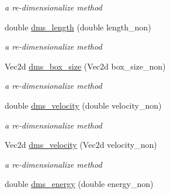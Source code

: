 \begin{CompactItemize}
\begin{CompactList}\small\item\em a re-dimensionalize method \item\end{CompactList}\item 
\hypertarget{classInitiation_d6747d9cbd12e6327249606b021a87f1}{
double \hyperlink{classInitiation_d6747d9cbd12e6327249606b021a87f1}{dms\_\-length} (double length\_\-non)}
\label{classInitiation_d6747d9cbd12e6327249606b021a87f1}

\begin{CompactList}\small\item\em a re-dimensionalize method \item\end{CompactList}\item 
\hypertarget{classInitiation_8b5815911256da330c686c9e84e3ccbc}{
Vec2d \hyperlink{classInitiation_8b5815911256da330c686c9e84e3ccbc}{dms\_\-box\_\-size} (Vec2d box\_\-size\_\-non)}
\label{classInitiation_8b5815911256da330c686c9e84e3ccbc}

\begin{CompactList}\small\item\em a re-dimensionalize method \item\end{CompactList}\item 
\hypertarget{classInitiation_1bbabaf118b739c082d9db6e5a0d1021}{
double \hyperlink{classInitiation_1bbabaf118b739c082d9db6e5a0d1021}{dms\_\-velocity} (double velocity\_\-non)}
\label{classInitiation_1bbabaf118b739c082d9db6e5a0d1021}

\begin{CompactList}\small\item\em a re-dimensionalize method \item\end{CompactList}\item 
\hypertarget{classInitiation_ff3a9cd4918e5d823b4a1413b805c056}{
Vec2d \hyperlink{classInitiation_ff3a9cd4918e5d823b4a1413b805c056}{dms\_\-velocity} (Vec2d velocity\_\-non)}
\label{classInitiation_ff3a9cd4918e5d823b4a1413b805c056}

\begin{CompactList}\small\item\em a re-dimensionalize method \item\end{CompactList}\item 
\hypertarget{classInitiation_d08c20a915f7c4878a8e382d54874fb1}{
double \hyperlink{classInitiation_d08c20a915f7c4878a8e382d54874fb1}{dms\_\-energy} (double energy\_\-non)}
\label{classInitiation_d08c20a915f7c4878a8e382d54874fb1}


\end{CompactItemize}

